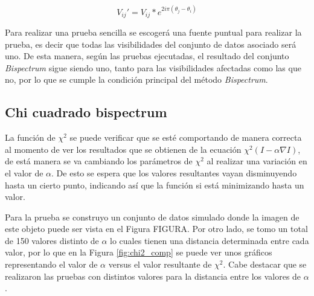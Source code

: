 \begin{equation}
    V_{ij}' = V_{ij}*e^{2i\pi(\theta_{j} - \theta_{i})}
\end{equation}

Para realizar una prueba sencilla se escogerá una fuente puntual para realizar la prueba, es decir que todas las visibilidades del conjunto de datos asociado será uno. De esta manera, según las pruebas ejecutadas, el resultado del conjunto \textit{Bispectrum} sigue siendo uno, tanto para las visibilidades afectadas como las que no, por lo que se cumple la condición principal del método \textit{Bispectrum}.

\subsection{Chi cuadrado bispectrum}

La función de $\chi^{2}$ se puede verificar que se esté comportando de manera correcta al momento de ver los resultados que se obtienen de la ecuación $\chi^{2}(I - \alpha \nabla I)$, de está manera se va cambiando los parámetros de $\chi^{2}$  al realizar una variación en el valor de $\alpha$. De esto se espera que los valores resultantes vayan disminuyendo hasta un cierto punto, indicando así que la función si está minimizando hasta un valor. 

Para la prueba se construyo un conjunto de datos simulado donde la imagen de este objeto puede ser vista en el Figura FIGURA. Por otro lado, se tomo un total de 150 valores distinto de $\alpha$ lo cuales tienen una distancia determinada entre cada valor, por lo que en la Figura \ref{fig:chi2_comp} se puede ver unos gráficos representando el valor de $\alpha$ versus el valor resultante de $\chi^{2}$. Cabe destacar que se realizaron las pruebas con distintos valores para la distancia entre los valores de $\alpha$.

